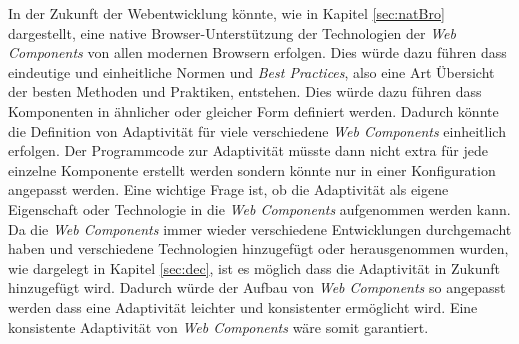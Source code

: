\documentclass[12pt, paper=a4, bibtotoc, toc=listof, headsepline=true, numbers=endperiod]{scrreprt}
\begin{document}
\newline
In der Zukunft der Webentwicklung könnte, wie in Kapitel \ref{sec:natBro} dargestellt, eine native Browser-Unterstützung der Technologien der \emph{Web Components} von allen modernen Browsern erfolgen. Dies würde dazu führen dass eindeutige und einheitliche Normen und \emph{Best Practices}, also eine Art Übersicht der besten Methoden und Praktiken, entstehen. Dies würde dazu führen dass Komponenten in ähnlicher oder gleicher Form definiert werden. Dadurch könnte die Definition von Adaptivität für viele verschiedene \emph{Web Components} einheitlich erfolgen. Der Programmcode zur Adaptivität müsste dann nicht extra für jede einzelne Komponente erstellt werden sondern könnte nur in einer Konfiguration angepasst werden. Eine wichtige Frage ist, ob die Adaptivität als eigene Eigenschaft oder Technologie in die \emph{Web Components} aufgenommen werden kann. Da die \emph{Web Components} immer wieder verschiedene Entwicklungen durchgemacht haben und verschiedene Technologien hinzugefügt oder herausgenommen wurden, wie dargelegt in Kapitel \ref{sec:dec}, ist es möglich dass die Adaptivität in Zukunft hinzugefügt wird. Dadurch würde der Aufbau von \emph{Web Components} so angepasst werden dass eine Adaptivität leichter und konsistenter ermöglicht wird. Eine konsistente Adaptivität von \emph{Web Components} wäre somit garantiert.
\printbibliography
\end{document}
